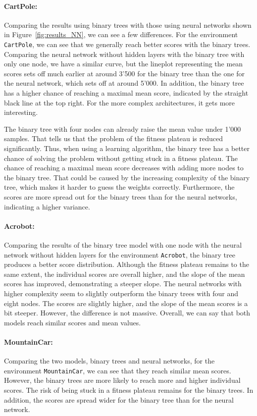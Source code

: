 \paragraph*{CartPole:} Comparing the results using binary trees with those using neural networks shown in Figure~\ref{fig:results_NN}, we can see a few differences. For the environment \verb|CartPole|, we can see that we generally reach  better scores with the binary trees. Comparing the neural network without hidden layers with the binary tree with only one node, we have a similar curve, but the lineplot representing the mean scores sets off much earlier at around 3'500 for the binary tree than the one for the neural network, which sets off at around 5'000. In addition, the binary tree has a higher chance of reaching a maximal mean score, indicated by the straight black line at the top right. For the more complex architectures, it gets more interesting.

The binary tree with four nodes can already raise the mean value under 1'000 samples. That tells us that the problem of the fitness plateau is reduced significantly. Thus, when using a learning algorithm, the binary tree has a better chance of solving the problem without getting stuck in a fitness plateau. The chance of reaching a maximal mean score decreases with adding more nodes to the binary tree. That could be caused by the increasing complexity of the binary tree, which makes it harder to guess the weights correctly. Furthermore, the scores are more spread out for the binary trees than for the neural networks, indicating a higher variance.

\paragraph*{Acrobot:} Comparing the results of the binary tree model with one node with the neural network without hidden layers for the environment \verb|Acrobot|, the binary tree produces a better score distribution. Although the fitness plateau remains to the same extent, the individual scores are overall higher, and the slope of the mean scores has improved, demonstrating a steeper slope. The neural networks with higher complexity seem to slightly outperform the binary trees with four and eight nodes. The scores are slightly higher, and the slope of the mean scores is a bit steeper. However, the difference is not massive. Overall, we can say that both models reach similar scores and mean values.

\paragraph*{MountainCar:} Comparing the two models, binary trees and neural networks, for the environment \verb|MountainCar|, we can see that they reach similar mean scores. However, the binary trees are more likely to reach more and higher individual scores. The risk of being stuck in a fitness plateau remains for the binary trees. In addition, the scores are spread wider for the binary tree than for the neural network.

